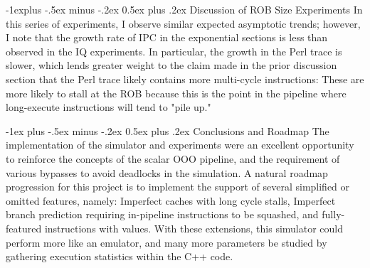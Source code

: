 \documentclass[12pt,portrait]{article}
\makeatletter
\renewcommand{\section}{\@startsection{section}{1}{0mm}%
                                {-1ex plus -.5ex minus -.2ex}%
                                {0.5ex plus .2ex}%
                                {\normalfont\large\bfseries}}
\renewcommand{\subsection}{\@startsection{subsection}{2}{0mm}%
                                {-1explus -.5ex minus -.2ex}%
                                {0.5ex plus .2ex}%
                                {\normalfont\normalsize\bfseries}}
\makeatother
\begin{document}
\subsection{Discussion of ROB Size Experiments}
In this series of experiments, I observe similar expected asymptotic trends; however, I note that the growth rate of IPC in the exponential sections is less than observed in the IQ experiments. In particular, the growth in the Perl trace is slower, which lends greater weight to the claim made in the prior discussion section that the Perl trace likely contains more multi-cycle instructions: These are more likely to stall at the ROB because this is the point in the pipeline where long-execute instructions will tend to "pile up."

\section{Conclusions and Roadmap}
The implementation of the simulator and experiments were an excellent opportunity to reinforce the concepts of the scalar OOO pipeline, and the requirement of various bypasses to avoid deadlocks in the simulation. A natural roadmap progression for this project is to implement the support of several simplified or omitted features, namely: Imperfect caches with long cycle stalls, Imperfect branch prediction requiring in-pipeline instructions to be squashed, and fully-featured instructions with values. With these extensions, this simulator could perform more like an emulator, and many more parameters be studied by gathering execution statistics within the C++ code.

\end{document}
